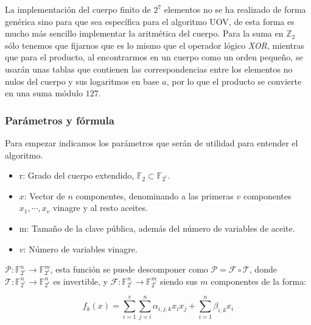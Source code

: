 La implementación del cuerpo finito de $2^7$ elementos no se ha realizado de forma genérica sino para que sea específica para el algoritmo UOV, de esta forma es mucho más sencillo implementar la aritmética del cuerpo. Para la suma en $\mathds{Z}_2$ sólo tenemos que fijarnos que es lo mismo que el operador lógico \textit{XOR}, mientras que para el producto, al encontrarmos en un cuerpo como un orden pequeño, se usarán unas tablas que contienen las correspondencias entre los elementos no nulos del cuerpo y sus logaritmos en base $a$, por lo que el producto se convierte en una suma módulo $127$.\\




\subsubsection{Parámetros y fórmula}
Para empezar indicamos los parámetros que serán de utilidad para entender el algoritmo.
\begin{itemize}
	\item r: Grado del cuerpo extendido, $\mathds{F}_2 \subset \mathds{F}_{2^r}$. %
	\item $x$: Vector de $n$ componentes, denominando a las primeras $v$ componentes  $x_1, \dotsb, x_v$ vinagre y al resto aceites.
	
	\item m: Tamaño de la clave pública, además del número de variables de aceite.
	\item $v$: Número de variables vinagre.
\end{itemize}

$\mathcal{P}: \mathds{F}_{2^r}^n \rightarrow \mathds{F}_{2^r}^m$, esta función se puede descomponer como $\mathcal{P} = \mathcal{F} \circ \mathcal{T}$, donde $\mathcal{T}: \mathds{F}_{2^r}^n \rightarrow \mathds{F}_{2^r}^n$ es invertible, y $\mathcal{F}: \mathds{F}_{2^r}^n \rightarrow \mathds{F}_{2^r}^m$ siendo sus $m$ componentes de la forma:

\begin{equation}\label{eq:fun}
f_k(x) = \sum_{i=1}^v \sum_{j=i}^n \alpha_{i,j,k} x_i x_j + \sum_{i=1}^n \beta_{i,k} x_i
\end{equation}


